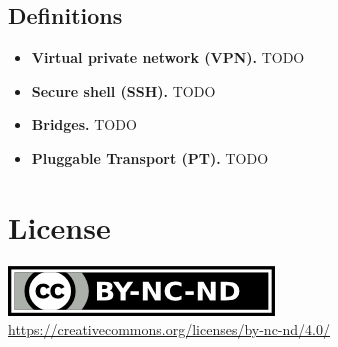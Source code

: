 \documentclass[sigconf, screen]{acmart}
\begin{document}
\subsection{Definitions}
\label{ss:definitions}
\begin{itemize}
	\item \textbf{Virtual private network (VPN).} TODO		%
	\item \textbf{Secure shell (SSH).} TODO 				%
	\item \textbf{Bridges.}	TODO 							%
	\item \textbf{Pluggable Transport (PT).} TODO 			%
\end{itemize}


\section*{License}
\label{s:license}
\begin{center}
	\includegraphics{by-nc-nd.png} \\
	\url{https://creativecommons.org/licenses/by-nc-nd/4.0/}
\end{center}
\end{document}
